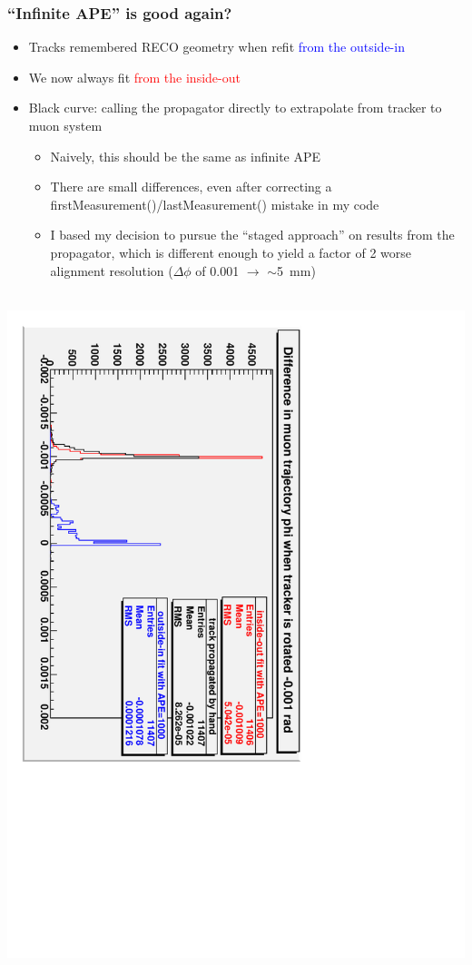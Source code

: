 \documentclass[compress]{beamer}
\begin{document}
\begin{frame}
\frametitle{``Infinite APE'' is good again?}

\small

\begin{itemize}
\item Tracks remembered RECO geometry when refit \textcolor{blue}{from the outside-in}
\item We now always fit \textcolor{red}{from the inside-out}
\item Black curve: calling the propagator directly to extrapolate from tracker to muon system
\begin{itemize}
\item Naively, this should be the same as infinite APE
\item There are small differences, even after correcting a
firstMeasurement()/lastMeasurement() mistake in my code
\item I based my decision to pursue the ``staged approach'' on results
from the propagator, which is different enough to yield a factor of 2
worse alignment resolution ($\Delta \phi$ of 0.001 $\to$ $\sim$5~mm)
\end{itemize}
\end{itemize}

\mbox{ } \hfill \includegraphics[height=0.5\linewidth, angle=90]{phi_propagation_differences.pdf} \hfill \mbox{ }
\end{frame}
\end{document}
